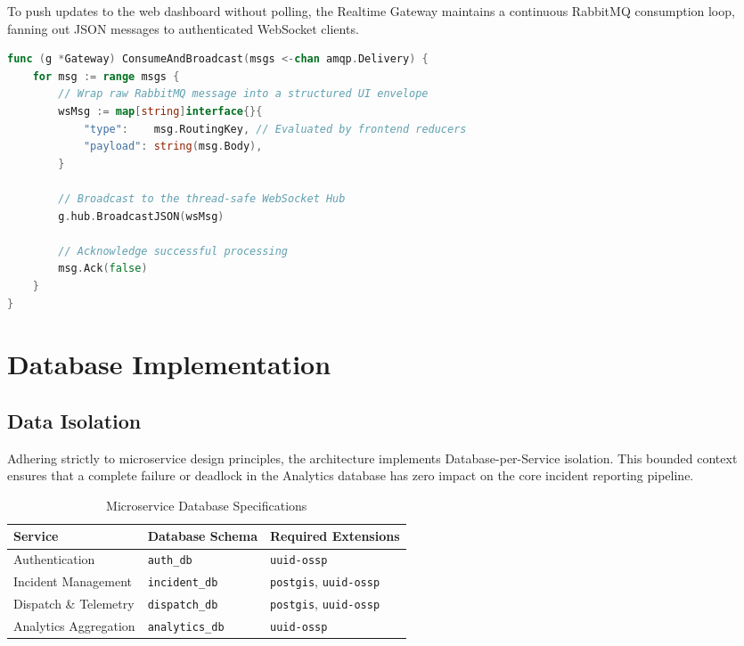 \documentclass[12pt,a4paper]{report}
\begin{document}
To push updates to the web dashboard without polling, the Realtime Gateway maintains a continuous RabbitMQ consumption loop, fanning out JSON messages to authenticated WebSocket clients.

\begin{lstlisting}[language=Go, caption=RabbitMQ Consumer in WebSocket Gateway]
func (g *Gateway) ConsumeAndBroadcast(msgs <-chan amqp.Delivery) {
	for msg := range msgs {
		// Wrap raw RabbitMQ message into a structured UI envelope
		wsMsg := map[string]interface{}{
			"type":    msg.RoutingKey, // Evaluated by frontend reducers
			"payload": string(msg.Body),
		}
		
		// Broadcast to the thread-safe WebSocket Hub
		g.hub.BroadcastJSON(wsMsg)
		
		// Acknowledge successful processing
		msg.Ack(false)
	}
}
\end{lstlisting}

\newpage

\chapter{Database Implementation}

\section{Data Isolation}

Adhering strictly to microservice design principles, the architecture implements Database-per-Service isolation. This bounded context ensures that a complete failure or deadlock in the Analytics database has zero impact on the core incident reporting pipeline.

\begin{table}[H]
\centering\small
\caption{Microservice Database Specifications}
\begin{tabular}{|l|l|l|}
\hline
\textbf{Service} & \textbf{Database Schema} & \textbf{Required Extensions} \\
\hline
Authentication & \texttt{auth\_db} & \texttt{uuid-ossp} \\
\hline
Incident Management & \texttt{incident\_db} & \texttt{postgis}, \texttt{uuid-ossp} \\
\hline
Dispatch \& Telemetry & \texttt{dispatch\_db} & \texttt{postgis}, \texttt{uuid-ossp} \\
\hline
Analytics Aggregation & \texttt{analytics\_db} & \texttt{uuid-ossp} \\
\hline
\end{tabular}
\end{table}
\end{document}
